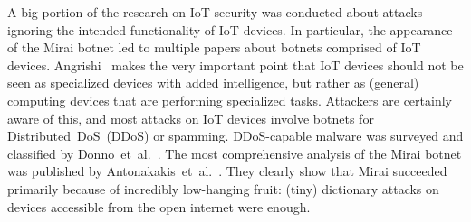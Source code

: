 A big portion of the research on IoT security was conducted about attacks ignoring the intended functionality of IoT devices. In particular, the appearance of the Mirai botnet \cite{Antonakakis:2017:UMB} led to multiple papers about botnets comprised of IoT devices.
Angrishi~\cite{Angrishi:2017:TitiiiviIb} makes the very important point that IoT devices should not be seen as specialized devices with added intelligence, but rather as (general) computing devices that are performing specialized tasks.
Attackers are certainly aware of this, and most attacks on IoT devices involve botnets for Distributed~DoS~(DDoS) or spamming. DDoS-capable malware was surveyed and classified by Donno~et~al.~\cite{Donno:2017:ADIM}.
The most comprehensive analysis of the Mirai botnet
was published by
Antonakakis~et~al.~\cite{Antonakakis:2017:UMB}. %
They clearly show that Mirai succeeded primarily because of incredibly low-hanging fruit: (tiny) dictionary attacks on devices accessible from the open internet were enough.


